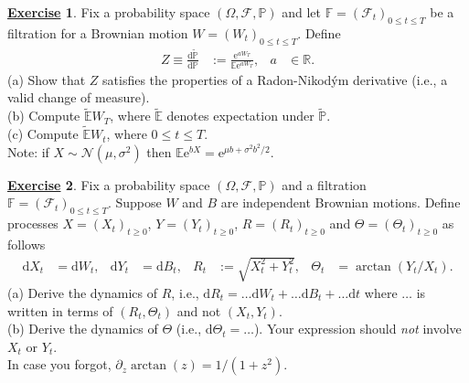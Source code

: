 \documentclass[12pt]{book}
\numberwithin{equation}{chapter}
\theoremstyle{plain}
\numberwithin{theorem}{section}
\theoremstyle{definition}
\newtheorem{exercise}{\underline{Exercise}}
\numberwithin{exercise}{chapter}
\newcommand{\<}{\langle}
\renewcommand{\>}{\rangle}
\renewcommand{\(}{\left(}
\renewcommand{\)}{\right)}
\renewcommand{\[}{\left[}
\renewcommand{\]}{\right]}
\newcommand\Eb{\mathds{E}}
\newcommand\Fb{\mathds{F}}
\newcommand\Pb{\mathds{P}}
\newcommand\Rb{\mathds{R}}
\newcommand\Fc{\mathscr{F}}
\newcommand\Nc{\mathscr{N}}
\newcommand\Om{\Omega}
\newcommand\sig{\sigma}
\newcommand\Ebt{\widetilde{\Eb}}
\newcommand\Pbt{\widetilde{\Pb}}
\renewcommand\d{\partial}
\newcommand\dd{\mathrm{d}}
\newcommand\ee{\mathrm{e}}
\begin{document}
\begin{exercise}
\label{exer:8.11}
Fix a probability space $(\Om, \Fc, \Pb)$ and let $\Fb = (\Fc_t)_{0 \leq t \leq T}$ be a filtration for a Brownian motion $W = (W_t)_{0 \leq t \leq T}$.  Define
\begin{align}
Z \equiv \frac{\dd \Pbt}{\dd \Pb}
	&:=	\frac{\ee^{a W_T}}{\Eb \ee^{a W_T}} , &
a
	&\in \Rb .
\end{align}
(a) Show that $Z$ satisfies the properties of a Radon-Nikod\'ym derivative (i.e., a valid change of measure).
\\[0.5em]
(b) Compute $\Ebt W_T$, where $\Ebt$ denotes expectation under $\Pbt$.  
\\[0.5em]
(c) Compute $\Ebt W_t$, where $0 \leq t \leq T$.
\\[0.5em]
Note: if $X \sim \Nc(\mu,\sig^2)$ then $\Eb \ee^{b X} = \ee^{\mu b + \sig^2 b^2 / 2}$.
\end{exercise}

\begin{exercise}
\label{exer:8.12}
Fix a probability space $(\Om, \Fc, \Pb)$ and a filtration $\Fb = (\Fc_t)_{0 \leq t \leq T}$.  Suppose $W$ and $B$ are independent Brownian motions.  Define processes $X = (X_t)_{t \geq 0}$, $Y=(Y_t)_{t \geq 0}$, $R=(R_t)_{t \geq 0}$ and $\Theta = (\Theta_t)_{t \geq 0}$ as follows
\begin{align}
\dd X_t
	&=	\dd W_t , &
\dd Y_t
	&=	\dd B_t , &
R_t
	&:=	\sqrt{X_t^2 + Y_t^2} , &
\Theta_t
	&=	\arctan ( Y_t / X_t ) .
\end{align}
(a) Derive the dynamics of $R$, i.e., $\dd R_t = \ldots \dd W_t + \ldots \dd B_t + \ldots \dd t$ where $\ldots$ is written in terms of $(R_t,\Theta_t)$ and not $(X_t,Y_t)$.
\\[0.5em]
(b) Derive the dynamics of $\Theta$ (i.e., $\dd \Theta_t = \ldots$).  Your expression should \textit{not} involve $X_t$ or $Y_t$.
\\[0.5em]
In case you forgot, $\d_z \arctan(z) = 1/(1+z^2)$.
\end{exercise}
\end{document}
